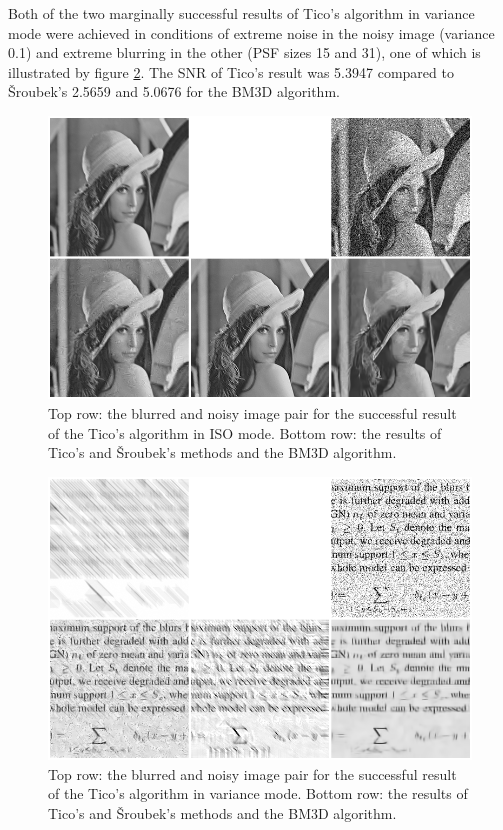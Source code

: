\documentclass[12pt,notitlepage]{report}
\begin{document}
Both of the two marginally successful results of Tico's algorithm in variance mode were achieved in conditions of extreme noise in the noisy image (variance 0.1) and extreme blurring in the other (PSF sizes 15 and 31), one of which is illustrated by figure \ref{fig:tico09_var_success}. The SNR of Tico's result was 5.3947 compared to Šroubek's 2.5659 and 5.0676 for the BM3D algorithm. 

\begin{figure}[htb]
 \begin{center}
  \includegraphics[width=12cm]{tico09_iso_success.png}
 \end{center}
 \caption{Top row: the blurred and noisy image pair for the successful result of the Tico's algorithm in ISO mode. Bottom row: the results of Tico's and Šroubek's methods and the BM3D algorithm.}
 \label{fig:tico09_iso_success}
\end{figure}

\begin{figure}[htb]
 \begin{center}
  \includegraphics[width=12cm]{tico09_var_success.png}
 \end{center}
 \caption{Top row: the blurred and noisy image pair for the successful result of the Tico's algorithm in variance mode. Bottom row: the results of Tico's and Šroubek's methods and the BM3D algorithm.}
 \label{fig:tico09_var_success}
\end{figure}
\end{document}
